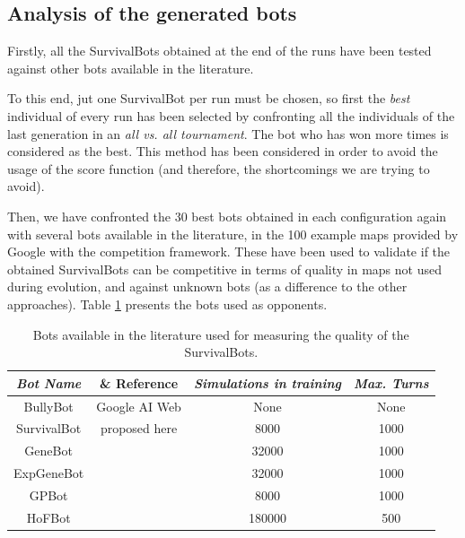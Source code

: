 \documentclass[conference]{IEEEtran}
\begin{document}

\subsection{Analysis of the generated bots}
\label{subsec:analysisbots}

Firstly, all the SurvivalBots obtained at the end of the runs have been tested against other bots available in the literature. 

To this end, jut one SurvivalBot per run must be chosen, so first the {\em best} individual of every run has been selected by confronting all the individuals of the last generation in an \textit{all vs. all tournament}. The bot who has won more times is considered as the best. This method has been considered in order to avoid the usage of the score function (and therefore, the shortcomings we are trying to avoid). 

Then, we have confronted the 30 best bots obtained in each configuration again with several bots available in the literature, in the 100 example maps provided by Google with the competition framework. These have been used to validate if the obtained SurvivalBots can be competitive in terms of quality in maps not used during evolution, and against unknown bots (as a difference to the other approaches). Table \ref{tab:literaturebots} presents the bots used as opponents. 

\begin{table}
\begin{center}
\begin{tabular}{|c|c|c|c|}
\hline
{\em Bot Name} & {\& Reference} & {\em Simulations in training} & {\em Max. Turns} \\\hline \hline
BullyBot & Google AI Web & None & None \\ \hline
SurvivalBot & proposed here & 8000 & 1000 \\ \hline
GeneBot & \cite{Genebot_JCST} & 32000 & 1000 \\ \hline
ExpGeneBot & \cite{Genebot_CIG2012} & 32000 & 1000 \\ \hline
GPBot & \cite{GarciaGP14} & 8000 & 1000 \\ \hline
HoFBot & \cite{NogueiraCoevolutionary14} & 180000 & 500 \\ \hline
\end{tabular}
\caption{Bots available in the literature used for measuring the quality of the SurvivalBots.}     %
\label{tab:literaturebots}
\end{center}
\end{table}
\end{document}
